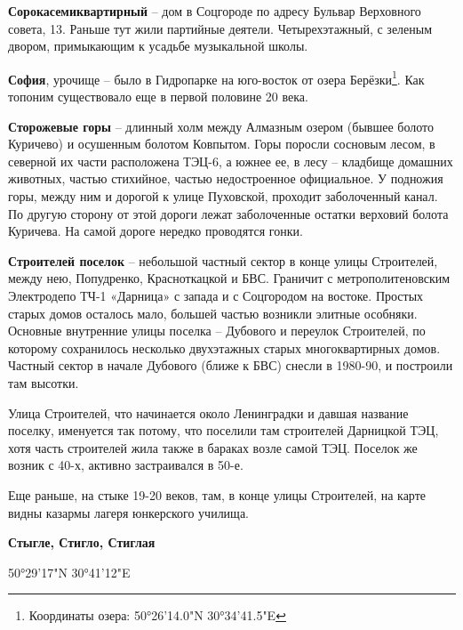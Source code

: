 \medskip




\textbf{Сорокасемиквартирный} – дом в Соцгороде по адресу Бульвар Верховного совета, 13. Раньше тут жили партийные деятели. Четырехэтажный, с зеленым двором, примыкающим к усадьбе музыкальной школы.\\

\medskip

\textbf{София}, урочище – было в Гидропарке на юго-восток от озера Берёзки\footnote{Координаты озера: 50°26'14.0"N 30°34'41.5"E}. Как топоним существовало еще в первой половине 20 века.\\

\medskip

 
\textbf{Сторожевые горы} – длинный холм между Алмазным озером (бывшее болото Куричево) и осушенным болотом Ковпытом. Горы поросли сосновым лесом, в северной их части расположена ТЭЦ-6, а южнее ее, в лесу – кладбище домашних животных, частью стихийное, частью недостроенное официальное. У подножия горы, между ним и дорогой к улице Пуховской, проходит заболоченный канал. По другую сторону от этой дороги лежат заболоченные остатки верховий болота Куричева. На самой дороге нередко проводятся гонки.\\

\medskip

\textbf{Строителей поселок} – небольшой частный сектор в конце улицы Строителей, между нею, Попудренко, Красноткацкой и БВС. Граничит с метрополитеновским Электродепо ТЧ-1 «Дарница» с запада и с Соцгородом на востоке. Простых старых домов осталось мало, большей частью возникли элитные особняки. Основные внутренние улицы поселка – Дубового и переулок Строителей, по которому сохранилось несколько двухэтажных старых многоквартирных домов. Частный сектор в начале Дубового (ближе к БВС) снесли в 1980-90, и построили там высотки.

Улица Строителей, что начинается около Ленинградки и давшая название поселку, именуется так потому, что поселили там строителей Дарницкой ТЭЦ, хотя часть строителей жила также в бараках возле самой ТЭЦ. Поселок же возник с 40-х, активно застраивался в 50-е.

Еще раньше, на стыке 19-20 веков, там, в конце улицы Строителей, на карте видны казармы лагеря юнкерского училища.\\

\medskip

\textbf{Стыгле, Стигло, Стиглая}

50°29'17"N 30°41'12"E

